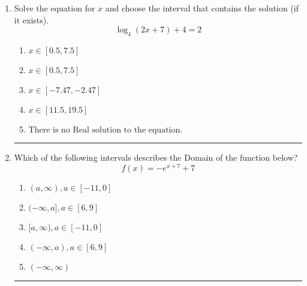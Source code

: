 \documentclass[14pt]{extbook}
\newcommand{\litem}[1]{\item#1\hspace*{-1cm}\rule{\textwidth}{0.4pt}}
\begin{document}
\begin{enumerate}
{\begin{enumerate}[label=\Alph*.]
\end{enumerate} }
\litem{
Solve the equation for $x$ and choose the interval that contains the solution (if it exists).\[ \log_{4}{(2x+7)}+4 = 2 \]\begin{enumerate}[label=\Alph*.]
\item \( x \in [0.5, 7.5] \)
\item \( x \in [0.5, 7.5] \)
\item \( x \in [-7.47, -2.47] \)
\item \( x \in [11.5, 19.5] \)
\item \( \text{There is no Real solution to the equation.} \)

\end{enumerate} }
\litem{
Which of the following intervals describes the Domain of the function below?\[ f(x) = -e^{x+7}+7 \]\begin{enumerate}[label=\Alph*.]
\item \( (a, \infty), a \in [-11, 0] \)
\item \( (-\infty, a], a \in [6, 9] \)
\item \( [a, \infty), a \in [-11, 0] \)
\item \( (-\infty, a), a \in [6, 9] \)
\item \( (-\infty, \infty) \)

\end{enumerate} }
\end{enumerate}
\end{document}

